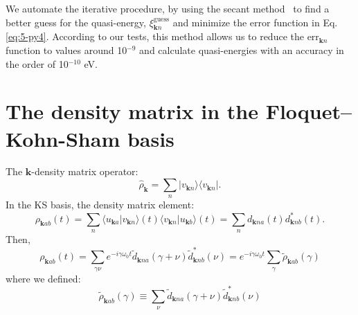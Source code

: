 \documentclass[aps,physrev,preprint,groupedaddress]{revtex4-2}
\newcommand{\kpt}{\mathbf{k}}
\renewcommand{\[}{\left[}
\renewcommand{\]}{\right]}
\renewcommand{\(}{\left(}
\renewcommand{\)}{\right)}
\begin{document}
We automate the iterative procedure, by using the secant method~\cite{Burden2015} to find a better guess for the quasi-energy, $\xi_{\kpt n}^\text{guess}$ and minimize the error function in Eq. \ref{eq:5-py4}. According to our tests, this method allows us to reduce the $\text{err}_{\kpt n}$ function to values around 10$^{-9}$ and calculate quasi-energies with an accuracy in the order of 10$^{-10}$ \si{\eV}. 




\appendix
\section{The density matrix in the Floquet--Kohn-Sham basis}
The $\kpt$-density matrix operator:
\begin{equation}
    \hat\rho_\kpt = \sum_n | v_{\kpt n} \rangle \langle v_{\kpt n} |.   
\end{equation}
In the KS basis, the density matrix element:
\begin{equation}
    \rho_{\kpt ab}(t) = \sum_n \langle u_{\kpt a}| v_{\kpt n} \rangle (t)\langle v_{\kpt n} |u_{\kpt b}\rangle (t) = \sum_n d_{\kpt na}(t) d^*_{\kpt nb}(t).   
\end{equation}
Then,
\begin{equation}
    \rho_{\kpt ab}(t) = \sum_{\gamma \nu} e^{-i\gamma \omega_0 t} \tilde d_{\kpt na}(\gamma+\nu) \tilde d^*_{\kpt nb}(\nu) = e^{-i\gamma \omega_0 t} \sum_\gamma \tilde\rho_{\kpt ab}(\gamma)    
\end{equation}
where we defined: 
\begin{equation}
    \tilde\rho_{\kpt ab}(\gamma)  \equiv \sum_{\nu} \tilde d_{\kpt na}(\gamma+\nu) \tilde d^*_{\kpt nb}(\nu) %
\end{equation}
\end{document}
